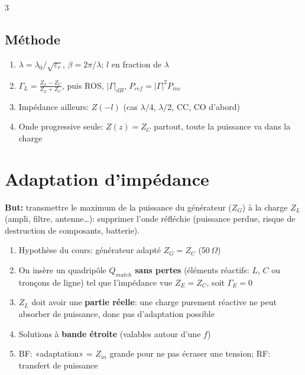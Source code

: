 \documentclass[12pt, a4paper]{article}
\begin{document}
\begin{multicols*}{3}
	\subsection{Méthode}
	\begin{enumerate}[\roman*.]
		\item $\lambda=\lambda_0/\sqrt{\varepsilon_r}$, $\beta=2\pi/\lambda$; $l$ en fraction de $\lambda$
		\item $\Gamma_L=\frac{Z_L-Z_C}{Z_L+Z_C}$, puis ROS, $|\Gamma|_{dB}$, $P_{ref}=|\Gamma|^2P_{inc}$
		\item Impédance ailleurs: $Z(-l)$ (cas $\lambda/4$, $\lambda/2$, CC, CO d'abord)
		\item Onde progressive seule: $Z(z)=Z_C$ partout, toute la puissance va dans la charge
	\end{enumerate}

	\colbreak
	\section{Adaptation d'impédance}
	\textbf{But:} transmettre le maximum de la puissance du générateur ($Z_G$) à la charge $Z_L$ (ampli, filtre, antenne\dots): supprimer l'onde réfléchie (puissance perdue, risque de destruction de composants, batterie).
	\begin{enumerate}[\roman*.]
		\item Hypothèse du cours: générateur adapté $Z_G=Z_C$ (50\,$\Omega$)
		\item On insère un quadripôle $Q_{match}$ \textbf{sans pertes} (éléments réactifs: $L$, $C$ ou tronçons de ligne) tel que l'impédance vue $Z_E=Z_C$, soit $\Gamma_E=0$
		\item $Z_L$ doit avoir une \textbf{partie réelle}: une charge purement réactive ne peut absorber de puissance, donc pas d'adaptation possible
		\item Solutions à \textbf{bande étroite} (valables autour d'une $f$)
		\item BF: «adaptation» = $Z_{in}$ grande pour ne pas écraser une tension; RF: transfert de puissance
	\end{enumerate}


\end{multicols*}
\end{document}
